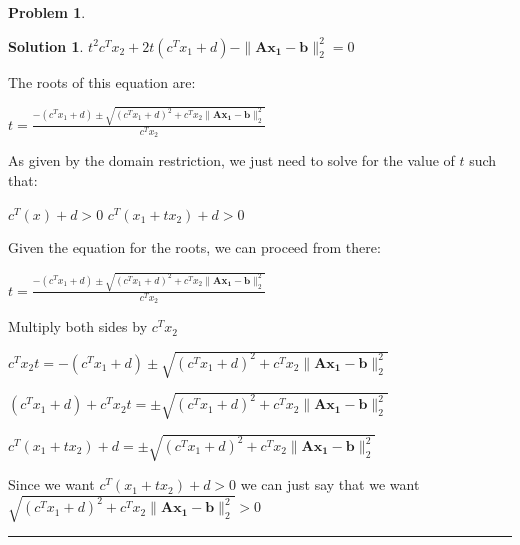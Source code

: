 \documentclass{article}
\theoremstyle{definition}
\newtheorem{problem}{Problem}
\def\fline{\rule{0.75\linewidth}{0.5pt}}
\newcommand{\finishline}{\begin{center}\fline\end{center}}
\newtheorem*{solution*}{Solution}
\newenvironment{solution}{\begin{solution*}}{{\finishline} \end{solution*}}
\begin{document}
\begin{problem}
\begin{enumerate}
\begin{solution}
         $t^2 c^Tx_2 + 2t(c^Tx_1 + d) - \|\mathbf{Ax_1 - b}\|^2_2  = 0 $ \newline 

         The roots of this equation are: \newline 

         $t = \frac{-(c^Tx_1 + d) \pm \sqrt{(c^Tx_1 + d)^2 + c^Tx_2 \|\mathbf{Ax_1 - b}\|^2_2}}{c^Tx_2}$

        As given by the domain restriction, we just need to solve for the value of $t$ such that: \newline 

        $c^T(x) + d > 0$ \newline 
        $c^T(x_1 + tx_2) + d > 0$ \newline 

        Given the equation for the roots, we can proceed from there: \newline 

        $t = \frac{-(c^Tx_1 + d) \pm \sqrt{(c^Tx_1 + d)^2 + c^Tx_2 \|\mathbf{Ax_1 - b}\|^2_2}}{c^Tx_2}$ \newline 

        Multiply both sides by $c^Tx_2$ \newline 

        $c^Tx_2 t = -(c^Tx_1 + d) \pm \sqrt{(c^Tx_1 + d)^2 + c^Tx_2 \|\mathbf{Ax_1 - b}\|^2_2}$ \newline 

        $(c^Tx_1 + d) + c^Tx_2 t = \pm \sqrt{(c^Tx_1 + d)^2 + c^Tx_2 \|\mathbf{Ax_1 - b}\|^2_2}$ \newline 

        $c^T(x_1 + tx_2) + d = \pm \sqrt{(c^Tx_1 + d)^2 + c^Tx_2 \|\mathbf{Ax_1 - b}\|^2_2}$
        

        Since we want $c^T(x_1 + tx_2) + d > 0$ \newline 
        we can just say that we want  
        $\sqrt{(c^Tx_1 + d)^2 + c^Tx_2 \|\mathbf{Ax_1 - b}\|^2_2} > 0$

         
        
        
    \end{solution}
\end{enumerate}
\end{problem}
\end{document}
